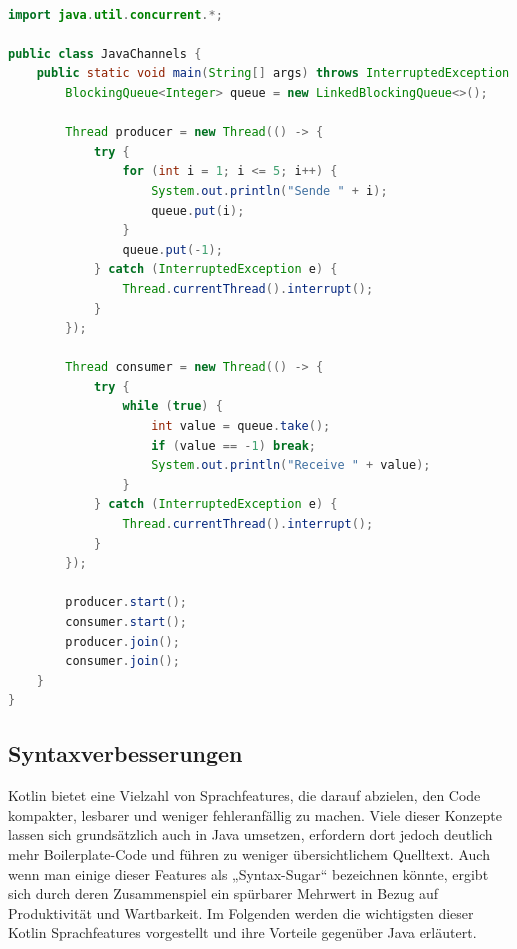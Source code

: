 \documentclass[11pt]{article}
\begin{document}
    \begin{lstlisting}[language=Java, caption={JavaChannels.java}, label={lst:java-channels}]

import java.util.concurrent.*;

public class JavaChannels {
    public static void main(String[] args) throws InterruptedException {
        BlockingQueue<Integer> queue = new LinkedBlockingQueue<>();

        Thread producer = new Thread(() -> {
            try {
                for (int i = 1; i <= 5; i++) {
                    System.out.println("Sende " + i);
                    queue.put(i);
                }
                queue.put(-1);
            } catch (InterruptedException e) {
                Thread.currentThread().interrupt();
            }
        });

        Thread consumer = new Thread(() -> {
            try {
                while (true) {
                    int value = queue.take();
                    if (value == -1) break;
                    System.out.println("Receive " + value);
                }
            } catch (InterruptedException e) {
                Thread.currentThread().interrupt();
            }
        });

        producer.start();
        consumer.start();
        producer.join();
        consumer.join();
    }
}
    \end{lstlisting}

    \subsection{Syntaxverbesserungen}
    Kotlin bietet eine Vielzahl von Sprachfeatures, die darauf abzielen, den Code kompakter, lesbarer und weniger fehleranfällig zu machen.
    Viele dieser Konzepte lassen sich grundsätzlich auch in Java umsetzen, erfordern dort jedoch deutlich mehr Boilerplate-Code und führen zu weniger übersichtlichem Quelltext.
    Auch wenn man einige dieser Features als „Syntax-Sugar“ bezeichnen könnte, ergibt sich durch deren Zusammenspiel ein spürbarer Mehrwert in Bezug auf Produktivität und Wartbarkeit.
    Im Folgenden werden die wichtigsten dieser Kotlin Sprachfeatures vorgestellt und ihre Vorteile gegenüber Java erläutert.
\end{document}
